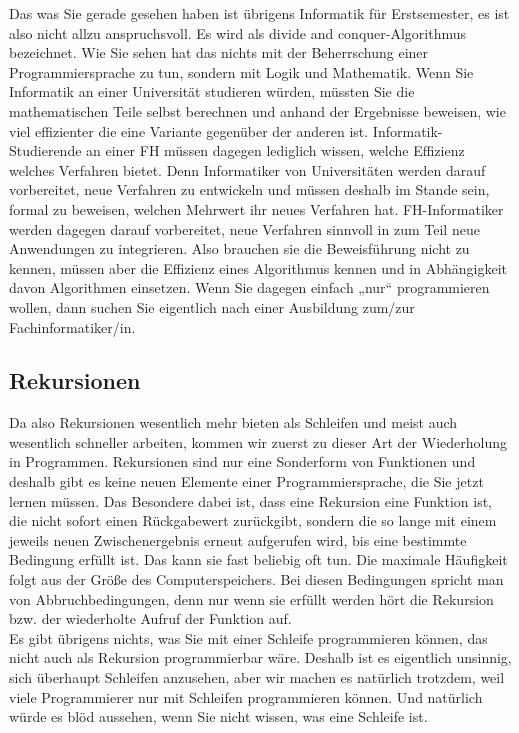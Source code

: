 Das was Sie gerade gesehen haben ist übrigens Informatik für Erstsemester, es ist also nicht allzu anspruchsvoll. Es wird als divide and conquer-Algorithmus bezeichnet. Wie Sie sehen hat das nichts mit der Beherrschung einer Programmiersprache zu tun, sondern mit Logik und Mathematik. Wenn Sie Informatik an einer Universität studieren würden, müssten Sie die mathematischen Teile selbst berechnen und anhand der Ergebnisse beweisen, wie viel effizienter die eine Variante gegenüber der anderen ist. Informatik-Studierende an einer FH müssen dagegen lediglich wissen, welche Effizienz welches Verfahren bietet. Denn Informatiker von Universitäten werden darauf vorbereitet, neue Verfahren zu entwickeln und müssen deshalb im Stande sein, formal zu beweisen, welchen Mehrwert ihr neues Verfahren hat. FH-Informatiker werden dagegen darauf vorbereitet, neue Verfahren sinnvoll in zum Teil neue Anwendungen zu integrieren. Also brauchen sie die Beweisführung nicht zu kennen, müssen aber die Effizienz eines Algorithmus kennen und in Abhängigkeit davon Algorithmen einsetzen. Wenn Sie dagegen einfach „nur“ programmieren wollen, dann suchen Sie eigentlich nach einer Ausbildung zum/zur Fachinformatiker/in.

\subsection{Rekursionen}

Da also Rekursionen wesentlich mehr bieten als Schleifen und meist auch wesentlich schneller arbeiten, kommen wir zuerst zu dieser Art der Wiederholung in Programmen. Rekursionen sind nur eine Sonderform von Funktionen und deshalb gibt es keine neuen Elemente einer Programmiersprache, die Sie jetzt lernen müssen. Das Besondere dabei ist, dass eine Rekursion eine Funktion ist, die nicht sofort einen Rückgabewert zurückgibt, sondern die so lange mit einem jeweils neuen Zwischenergebnis erneut aufgerufen wird, bis eine bestimmte Bedingung erfüllt ist. Das kann sie fast beliebig oft tun. Die maximale Häufigkeit folgt aus der Größe des Computerspeichers. Bei diesen Bedingungen spricht man von Abbruchbedingungen, denn nur wenn sie erfüllt werden hört die Rekursion bzw. der wiederholte Aufruf der Funktion auf.\\

Es gibt übrigens nichts, was Sie mit einer Schleife programmieren können, das nicht auch als Rekursion programmierbar wäre. Deshalb ist es eigentlich unsinnig, sich überhaupt Schleifen anzusehen, aber wir machen es natürlich trotzdem, weil viele Programmierer nur mit Schleifen programmieren können. Und natürlich würde es blöd aussehen, wenn Sie nicht wissen, was eine Schleife ist.\\


